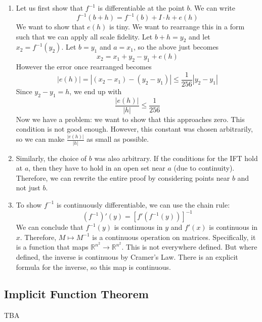 \documentclass{article}
\numberwithin{equation}{section}
\begin{document}
\begin{enumerate}
    \item Let us first show that $f^{-1}$ is differentiable at the point $b$. We can write
          \begin{equation}
              f^{-1}(b+h) = f^{-1}(b) + I\cdot h + e(h)
          \end{equation}
          We want to show that $e(h)$ is tiny. We want to rearrange this in a form such that we can apply all scale fidelity. Let $b+h = y_2$ and let $x_2=f^{-1}(y_2).$ Let $b=y_1$ and $a=x_1$, so the above just becomes
          \begin{equation}
              x_2 = x_1 + y_2-y_1 + e(h)
          \end{equation}
          However the error once rearranged becomes
          \begin{equation}
              |e(h)| = |(x_2-x_1)-(y_2-y_1)| \le \frac{1}{256}|y_2-y_1|
          \end{equation}
          Since $y_2-y_1=h$, we end up with
          \begin{equation}
              \frac{|e(h)|}{|h|} \le \frac{1}{256}
          \end{equation}
          Now we have a problem: we want to show that this approaches zero. This condition is not good enough. However, this constant was chosen arbitrarily, so we can make $\frac{|e(h)|}{|h|}$ as small as possible.
    \item Similarly, the choice of $b$ was also arbitrary. If the conditions for the IFT hold at $a$, then they have to hold in an open set near $a$ (due to continuity). Therefore, we can rewrite the entire proof by considering points near $b$ and not just $b$.
    \item To show $f^{-1}$ is continuously differentiable, we can use the chain rule:
          \begin{equation}
              (f^{-1})'(y) = [f'(f^{-1}(y))]^{-1}
          \end{equation}
          We can conclude that $f^{-1}(y)$ is continuous in $y$ and $f'(x)$ is continuous in $x$. Therefore, $M \mapsto M^{-1}$ is a continuous operation on matrices. Specifically, it is a function that maps $\mathbb{R}^{n^2}\rightarrow \mathbb{R}^{n^2}.$ This is not everywhere defined. But where defined, the inverse is continuous by Cramer's Law. There is an explicit formula for the inverse, so this map is continuous.
\end{enumerate}
\subsection{Implicit Function Theorem}
TBA
\end{document}
